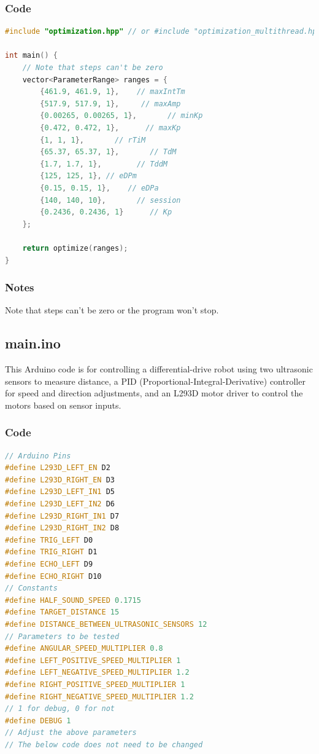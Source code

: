 \documentclass[a4paper,12pt]{article}
\begin{document}
\begin{lstlising}[language=C++]
\subsubsection{Code}
\begin{lstlisting}[language=C++]
#include "optimization.hpp" // or #include "optimization_multithread.hpp"

int main() {
    // Note that steps can't be zero
    vector<ParameterRange> ranges = {
        {461.9, 461.9, 1},    // maxIntTm
        {517.9, 517.9, 1},     // maxAmp
        {0.00265, 0.00265, 1},       // minKp
        {0.472, 0.472, 1},      // maxKp
        {1, 1, 1},       // rTiM
        {65.37, 65.37, 1},       // TdM
        {1.7, 1.7, 1},        // TddM
        {125, 125, 1}, // eDPm
        {0.15, 0.15, 1},    // eDPa
        {140, 140, 10},       // session
        {0.2436, 0.2436, 1}      // Kp
    };

    return optimize(ranges);
}
\end{lstlisting}
\subsubsection{Notes}
Note that steps can't be zero or the program won't stop.
\subsection{main.ino}
This Arduino code is for controlling a differential-drive robot using two ultrasonic sensors to measure distance, a PID (Proportional-Integral-Derivative) controller for speed and direction adjustments, and an L293D motor driver to control the motors based on sensor inputs.
\subsubsection{Code}
\begin{lstlisting}[language=C++]
// Arduino Pins
#define L293D_LEFT_EN D2
#define L293D_RIGHT_EN D3
#define L293D_LEFT_IN1 D5
#define L293D_LEFT_IN2 D6
#define L293D_RIGHT_IN1 D7
#define L293D_RIGHT_IN2 D8
#define TRIG_LEFT D0
#define TRIG_RIGHT D1
#define ECHO_LEFT D9
#define ECHO_RIGHT D10
// Constants
#define HALF_SOUND_SPEED 0.1715
#define TARGET_DISTANCE 15
#define DISTANCE_BETWEEN_ULTRASONIC_SENSORS 12
// Parameters to be tested
#define ANGULAR_SPEED_MULTIPLIER 0.8
#define LEFT_POSITIVE_SPEED_MULTIPLIER 1
#define LEFT_NEGATIVE_SPEED_MULTIPLIER 1.2
#define RIGHT_POSITIVE_SPEED_MULTIPLIER 1
#define RIGHT_NEGATIVE_SPEED_MULTIPLIER 1.2
// 1 for debug, 0 for not
#define DEBUG 1
// Adjust the above parameters
// The below code does not need to be changed


\end{lstlisting}
\end{lstlising}
\end{document}
